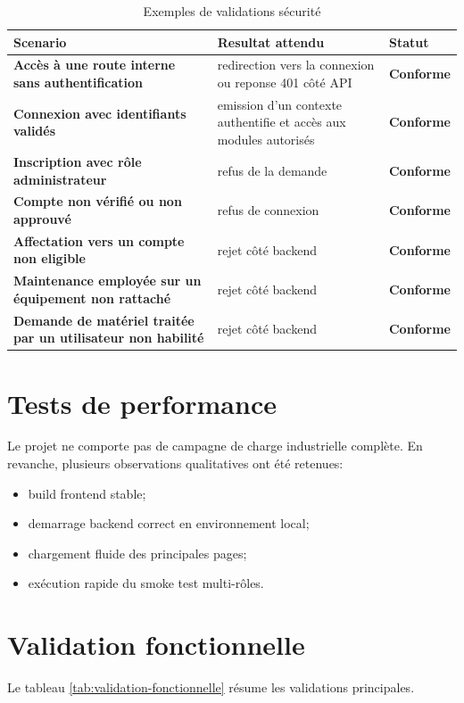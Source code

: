 ﻿\documentclass[12pt,a4paper,oneside]{report}
\begin{document}
\begin{table}[H]
\centering
\caption{Exemples de validations sécurité}
\label{tab:tests-securite}
\begin{tabularx}{\textwidth}{>{\bfseries}p{4cm}X>{\bfseries}p{2cm}}
\toprule
Scenario & Resultat attendu & Statut \\
\midrule
Accès à une route interne sans authentification & redirection vers la connexion ou reponse 401 côté API & Conforme \\
Connexion avec identifiants validés & emission d'un contexte authentifie et accès aux modules autorisés & Conforme \\
Inscription avec rôle administrateur & refus de la demande & Conforme \\
Compte non vérifié ou non approuvé & refus de connexion & Conforme \\
Affectation vers un compte non eligible & rejet côté backend & Conforme \\
Maintenance employée sur un équipement non rattaché & rejet côté backend & Conforme \\
Demande de matériel traitée par un utilisateur non habilité & rejet côté backend & Conforme \\
\bottomrule
\end{tabularx}
\end{table}

\section{Tests de performance}
Le projet ne comporte pas de campagne de charge industrielle complète. En revanche, plusieurs observations qualitatives ont été retenues:
\begin{itemize}
  \item build frontend stable;
  \item demarrage backend correct en environnement local;
  \item chargement fluide des principales pages;
  \item exécution rapide du smoke test multi-rôles.
\end{itemize}

\section{Validation fonctionnelle}
Le tableau \ref{tab:validation-fonctionnelle} résume les validations principales.
\end{document}
